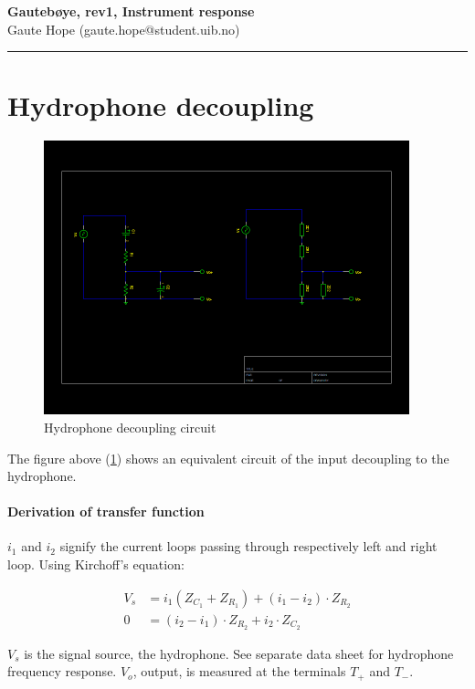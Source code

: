 \documentclass[a4paper]{article}
\newcommand{\makeheading}[2]%
        {\hspace*{-\marginparsep minus \marginparwidth}%
         \begin{minipage}[t]{\textwidth\marginparwidth\marginparsep}%
           {\large \bfseries #1}\\{#2}\\[-0.15\baselineskip]%
                 \rule{\columnwidth}{1pt}%
         \end{minipage}}
\begin{document}
\makeheading{Gautebøye, rev1, Instrument response}{Gaute Hope
(gaute.hope@student.uib.no)}

\section{Hydrophone decoupling}
\begin{figure}[h]
  \begin{center}
  \includegraphics[width=400px]{Hydrophone_decoupling.png}
\end{center}
  \caption{Hydrophone decoupling circuit}
  \label{fig:hydrophone_decoupling}
\end{figure}

The figure above (\ref{fig:hydrophone_decoupling}) shows an equivalent
circuit of the input decoupling to the hydrophone.

\paragraph{Derivation of transfer function}

$i_1$ and $i_2$ signify the current loops passing through respectively left
and right loop. Using Kirchoff's equation:

\begin{align}
  \label{eqn:currents_1}
  V_s &= i_1 (Z_{C_1} + Z_{R_1}) + (i_1 - i_2) \cdot Z_{R_2} \\
  0   &= (i_2 - i_1) \cdot Z_{R_2} + i_2 \cdot Z_{C_2}
  \label{eqn:currents_2}
\end{align}

$V_s$ is the signal source, the hydrophone. See separate data sheet for
hydrophone frequency response. $V_o$, output, is measured at the
terminals $T_+$ and $T_-$.
\end{document}
